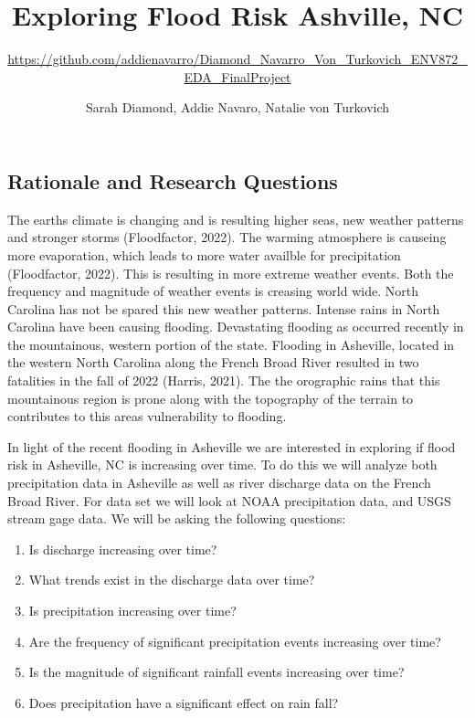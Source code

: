 \documentclass[
]{article}
\title{\textbf{Exploring Flood Risk Ashville, NC}}
\subtitle{\url{https://github.com/addienavarro/Diamond_Navarro_Von_Turkovich_ENV872_EDA_FinalProject}}
\author{Sarah Diamond, Addie Navaro, Natalie von Turkovich}
\date{}
\begin{document}
\maketitle

\newpage
\tableofcontents 
\newpage
\listoftables 
\newpage
\listoffigures 
\newpage

\hypertarget{rationale-and-research-questions}{%
\subsection{\texorpdfstring{\textbf{Rationale and Research
Questions}}{Rationale and Research Questions}}\label{rationale-and-research-questions}}

The earths climate is changing and is resulting higher seas, new weather
patterns and stronger storms (Floodfactor, 2022). The warming atmosphere
is causeing more evaporation, which leads to more water availble for
precipitation (Floodfactor, 2022). This is resulting in more extreme
weather events. Both the frequency and magnitude of weather events is
creasing world wide. North Carolina has not be spared this new weather
patterns. Intense rains in North Carolina have been causing flooding.
Devastating flooding as occurred recently in the mountainous, western
portion of the state. Flooding in Asheville, located in the western
North Carolina along the French Broad River resulted in two fatalities
in the fall of 2022 (Harris, 2021). The the orographic rains that this
mountainous region is prone along with the topography of the terrain to
contributes to this areas vulnerability to flooding.

In light of the recent flooding in Asheville we are interested in
exploring if flood risk in Asheville, NC is increasing over time. To do
this we will analyze both precipitation data in Asheville as well as
river discharge data on the French Broad River. For data set we will
look at NOAA precipitation data, and USGS stream gage data. We will be
asking the following questions:

\begin{enumerate}
\def\labelenumi{\arabic{enumi}.}
\item
  Is discharge increasing over time?
\item
  What trends exist in the discharge data over time?
\item
  Is precipitation increasing over time?
\item
  Are the frequency of significant precipitation events increasing over
  time?
\item
  Is the magnitude of significant rainfall events increasing over time?
\item
  Does precipitation have a significant effect on rain fall?
\end{enumerate}
\end{document}
